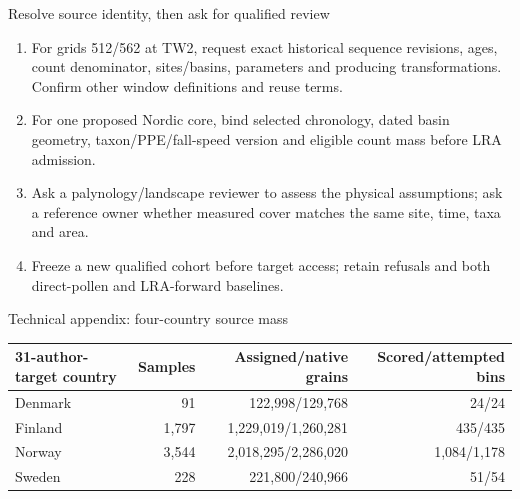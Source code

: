 \begin{frame}{Resolve source identity, then ask for qualified review}
\small
\begin{enumerate}
\item For grids 512/562 at TW2, request exact historical sequence revisions, ages, count denominator, sites/basins, parameters and producing transformations. Confirm other window definitions and reuse terms.
\item For one proposed Nordic core, bind selected chronology, dated basin geometry, taxon/PPE/fall-speed version and eligible count mass before LRA admission.
\item Ask a palynology/landscape reviewer to assess the physical assumptions; ask a reference owner whether measured cover matches the same site, time, taxa and area.
\item Freeze a new qualified cohort before target access; retain refusals and both direct-pollen and LRA-forward baselines.
\end{enumerate}
\end{frame}

\appendix
\begin{frame}{Technical appendix: four-country source mass}
\scriptsize
\begin{tabular}{lrrr}
\toprule
31-author-target country & Samples & Assigned/native grains & Scored/attempted bins \\
\midrule
Denmark & 91 & 122,998/129,768 & 24/24 \\
Finland & 1,797 & 1,229,019/1,260,281 & 435/435 \\
Norway & 3,544 & 2,018,295/2,286,020 & 1,084/1,178 \\
Sweden & 228 & 221,800/240,966 & 51/54 \\
\bottomrule
\end{tabular}
\end{frame}

